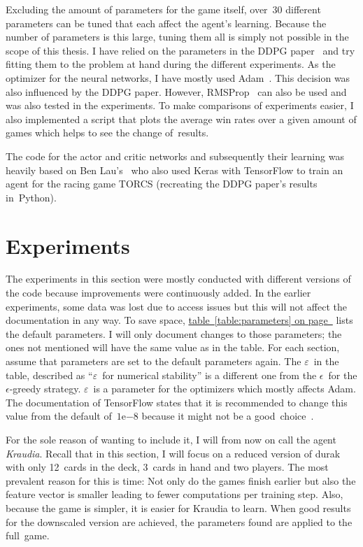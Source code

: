 \documentclass[a4paper,titlepage]{article}
\newcommand{\expn}[2]{{#1}\mathrm{e}{#2}}
\begin{document}
Excluding the amount of parameters for the game itself, over~30 different parameters can be tuned that each affect the agent's learning.
Because the number of parameters is this large, tuning them all is simply not possible in the scope of this thesis. I have relied on the parameters in the DDPG paper~\cite[p.~11]{ddpg} and try fitting them to the problem at hand during the different experiments.
As the optimizer for the neural networks, I have mostly used Adam~\cite{adam}. This decision was also influenced by the DDPG paper. However, RMSProp~\cite{rmsprop} can also be used and was also tested in the experiments.
To make comparisons of experiments easier, I also implemented a script that plots the average win rates over a given amount of games which helps to see the change of~results. \medskip

The code for the actor and critic networks and subsequently their learning was heavily based on Ben Lau's~\cite{torcs} who also used Keras with TensorFlow to train an agent for the racing game TORCS (recreating the DDPG paper's results in~Python).

\newpage

\section{Experiments}

The experiments in this section were mostly conducted with different versions of the code because improvements were continuously added. In the earlier experiments, some data was lost due to access issues but this will not affect the documentation in any way.
To save space, \hyperref[table:parameters]{table~\ref*{table:parameters} on page~\pageref*{table:parameters}} lists the default parameters.
I will only document changes to those parameters; the ones not mentioned will have the same value as in the table. For each section, assume that parameters are set to the default parameters again. The $\varepsilon$~in the table, described as ``$\varepsilon$~for numerical stability'' is a different one from the $\epsilon$~for the $\epsilon$-greedy strategy. $\varepsilon$~is a parameter for the optimizers which mostly affects Adam. The documentation of TensorFlow states that it is recommended to change this value from the default of~$\expn{1}{-8}$ because it might not be a good~choice~\cite{tfadam}.

For the sole reason of wanting to include it, I will from now on call the agent \emph{Kraudia}.
Recall that in this section, I will focus on a reduced version of durak with only 12~cards in the deck, 3~cards in hand and two players. The most prevalent reason for this is time: Not only do the games finish earlier but also the feature vector is smaller leading to fewer computations per training step.
Also, because the game is simpler, it is easier for Kraudia to learn. When good results for the downscaled version are achieved, the parameters found are applied to the full~game.
\end{document}
